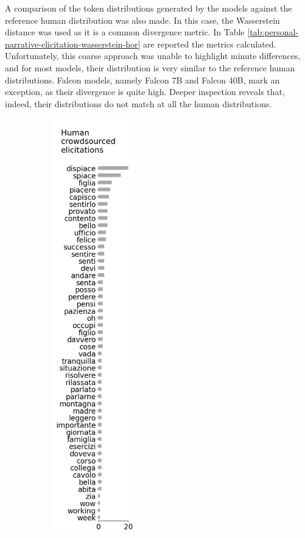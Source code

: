 
A comparison of the token distributions generated by the models against the reference human distribution was also made. In this case, the Wasserstein distance \cite{wasserstein} was used as it is a common divergence metric. In Table \ref{tab:personal-narrative-elicitation-wasserstein-hor} are reported the metrics calculated. Unfortunately, this coarse approach was unable to highlight minute differences, and for most models, their distribution is very similar to the reference human distributions. Falcon models, namely Falcon 7B and Falcon 40B, mark an exception, as their divergence is quite high. Deeper inspection reveals that, indeed, their distributions do not match at all the human distributions. 
\begin{figure}[!htbp]
    \centering
    \begin{subfigure}[t]{0.25\textwidth}
        \centering
        \includegraphics[height=18cm]{assets/imgs/dataset-test-set-top-50-answers-vertical.png}

\end{subfigure}
\end{figure}
